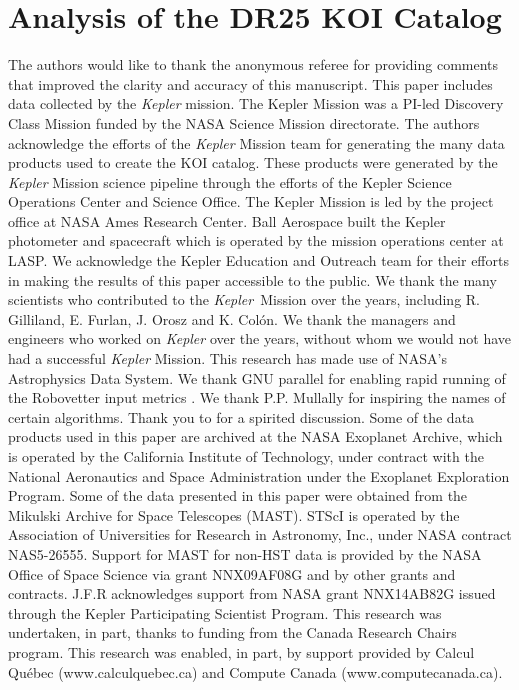 \documentclass[twocolumn,tighten,trackchanges]{aastex61}
\renewcommand{\_}{\discretionary{\underscore}{}{\underscore}}  %
\newcommand\Kepler{\textit{Kepler}}
\begin{document}
\section{Analysis of the DR25 KOI Catalog}












\acknowledgments
The authors would like to thank the anonymous referee for providing comments that improved the clarity and accuracy of this manuscript. 
This paper includes data collected by the \Kepler{} mission. The Kepler Mission was a PI-led Discovery Class Mission funded by the NASA Science Mission directorate. The authors acknowledge the efforts of the \Kepler{} Mission team for generating the many data products used to create the KOI catalog. These products were generated by the \Kepler{} Mission science pipeline through the efforts of the Kepler Science Operations Center and Science Office. The Kepler Mission is led by the project office at NASA Ames Research Center. Ball Aerospace built the Kepler photometer and spacecraft which is operated by the mission operations center at LASP.  
We acknowledge the Kepler Education and Outreach team for their efforts in making the results of this paper accessible to the public. We thank the many scientists who contributed to the \Kepler\ Mission over the years, including R. Gilliland, E. Furlan, J. Orosz and K. Col\'{o}n. We thank the managers and engineers who worked on \Kepler{} over the years, without whom we would not have had a successful \Kepler{} Mission. This research has made use of NASA's Astrophysics Data System. We thank GNU parallel for enabling rapid running of the Robovetter input metrics \citep{Tange2011a}. We thank P.P. Mullally for inspiring the names of certain algorithms. Thank you to \citet{Turbo-King2017} for a spirited discussion.
Some of the data products used in this paper are archived at the NASA Exoplanet Archive, which is operated by the California Institute of Technology, under contract with the National Aeronautics and Space Administration under the Exoplanet Exploration Program. Some of the data presented in this paper were obtained from the Mikulski Archive for Space Telescopes (MAST). STScI is operated by the Association of Universities for Research in Astronomy, Inc., under NASA contract NAS5-26555. Support for MAST for non-HST data is provided by the NASA Office of Space Science via grant NNX09AF08G and by other grants and contracts.  J.F.R acknowledges support from NASA grant NNX14AB82G issued through the Kepler Participating Scientist Program. This research was undertaken, in part, thanks to funding from the Canada Research Chairs program. This research was enabled, in part, by support provided by Calcul Qu\'{e}bec (www.calculquebec.ca) and Compute Canada (www.computecanada.ca). 
\end{document}
